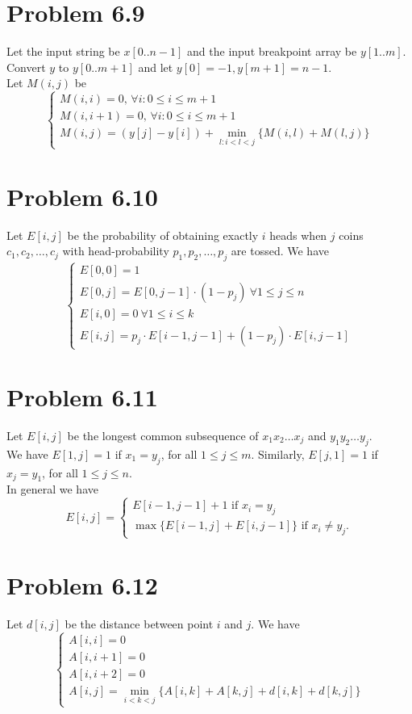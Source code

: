 \documentclass[12pt]{report}
\begin{document}
\section{Problem 6.9}
Let the input string be $x[0..n-1]$ and the input breakpoint array be $y[1..m]$. Convert $y$ to $y[0..m+1]$ and let $y[0] = -1, y[m+1] = n-1$. \\
Let $M(i,j)$ be 
$$\begin{cases} M(i,i)=0\text{, }\forall i: 0 \le i \le m + 1 \\
M(i,i + 1)=0\text{, }\forall i: 0 \le i \le m + 1\\
M(i,j)=\left(y[j]-y[i]\right) + \displaystyle \min_{l: i < l < j}\{M(i,l) + M(l,j)\}
\end{cases}$$

\section{Problem 6.10}
Let $E[i,j]$ be the probability of obtaining exactly $i$ heads when $j$ coins $c_1, c_2, \ldots, c_j$ with head-probability $p_1, p_2, \ldots, p_j$ are tossed.
We have $$\begin{cases} E[0,0] = 1 \\ E[0,j] = E[0,j-1] \cdot (1-p_j) \ \forall 1 \le j \le n \\ E[i,0] = 0 \ \forall 1 \le i \le k \\ E[i,j] = p_j \cdot E[i-1,j-1] + (1-p_j) \cdot E[i,j-1] \end{cases}$$

\section{Problem 6.11}
Let $E[i,j]$ be the longest common subsequence of $x_1 x_2 \ldots x_j$ and $y_1 y_2 \ldots y_j$. \\
We have $E[1,j] = 1$ if $x_1 = y_j$, for all $1 \le j \le m$. Similarly, $E[j,1] = 1$ if $x_j = y_1$, for all $1 \le j \le n$. \\
In general we have $$E[i,j] = \begin{cases} E[i-1,j-1] + 1 \text{ if } x_i = y_j \\ \max \{E[i-1,j] + E[i,j-1] \} \text{ if } x_i \ne y_j. \end{cases}$$

\section{Problem 6.12}
Let $d[i,j]$ be the distance between point $i$ and $j$. We have $$\begin{cases} A[i,i] = 0 \\ A[i, i + 1] = 0 \\ A[i, i+2] = 0 \\ A[i,j] = \displaystyle \min_{i < k < j} \{ A[i,k] + A[k,j] + d[i,k] + d[k,j]\} \end{cases}$$
\end{document}
